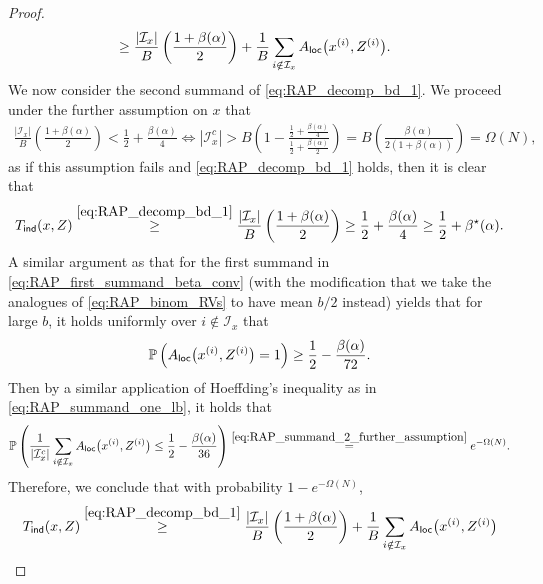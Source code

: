 \documentclass[11pt]{amsart}
\numberwithin{equation}{section}
\numberwithin{equation}{section}
\newcommand{\1}{\mathbbm{1}}
\newcommand{\Prob}{\mathbb{P}}
\newcommand{\ind}{\textup{\textsf{ind}}}
\newcommand{\loc}{\textup{\textsf{loc}}}
\theoremstyle{definition}
\begin{document}
\begin{appendices}
\begin{proof}
\begin{align}
        & \geq \frac{|\mathcal I_x|}{B}\left( \frac{1+\beta(\alpha)}{2} \right) + \frac{1}{B} \sum_{i \notin \mathcal I_x} A_\loc\big(x^{(i)}, Z^{(i)}\big). \label{eq:RAP_decomp_bd_1}
    \end{align}
    We now consider the second summand of \eqref{eq:RAP_decomp_bd_1}. We proceed under the further assumption on $x$ that
    \begin{align} \label{eq:RAP_summand_2_further_assumption}
        \frac{|\mathcal I_x|}{B}\left( \frac{1+\beta(\alpha)}{2} \right) < \frac{1}{2} + \frac{\beta(\alpha)}{4} \iff |\mathcal I_x^c| > B\left( 1 - \frac{\frac{1}{2} + \frac{\beta(\alpha)}{4}}{\frac{1}{2} + \frac{\beta(\alpha)}{2}} \right) = B\left( \frac{\beta(\alpha)}{2\left(1+\beta(\alpha)\right)} \right) = \Omega(N),
    \end{align}
    as if this assumption fails and \eqref{eq:RAP_decomp_bd_1} holds, then it is clear that
    \begin{align*}
        T_\ind(x, Z) \stackrel{\eqref{eq:RAP_decomp_bd_1}}{\geq} \frac{|\mathcal I_x|}{B}\left( \frac{1+\beta(\alpha)}{2} \right) \geq  \frac{1}{2} + \frac{\beta(\alpha)}{4} \geq \frac{1}{2} + \beta^\star(\alpha).
    \end{align*}
    A similar argument as that for the first summand in \eqref{eq:RAP_first_summand_beta_conv} (with the modification that we take the analogues of \eqref{eq:RAP_binom_RVs} to have mean $b/2$ instead) yields that for large $b$, it holds uniformly over $i \notin \mathcal I_x$ that
    \begin{align*}
        \Prob\left( A_\loc\big(x^{(i)}, Z^{(i)}\big) = 1 \right) \geq \frac{1}{2} - \frac{\beta(\alpha)}{72}.
    \end{align*}
    Then by a similar application of Hoeffding's inequality as in \eqref{eq:RAP_summand_one_lb}, it holds that
    \begin{align} \label{eq:RAP_summand_two_lb}
        \Prob\left( \frac{1}{|\mathcal I_x^c|} \sum_{i \notin \mathcal I_x} A_\loc\big(x^{(i)}, Z^{(i)}\big) \leq \frac{1}{2} - \frac{\beta(\alpha)}{36} \right) \stackrel{\eqref{eq:RAP_summand_2_further_assumption}}{=} e^{-\Omega(N)}.
    \end{align}
    Therefore, we conclude that with probability $1 - e^{-\Omega(N)}$,
    \begin{align*}
        T_\ind(x, Z) & \stackrel{\eqref{eq:RAP_decomp_bd_1}}{\geq} \frac{|\mathcal I_x|}{B}\left( \frac{1+\beta(\alpha)}{2} \right) + \frac{1}{B}\sum_{i \notin \mathcal I_x} A_\loc\big(x^{(i)}, Z^{(i)}\big) \\

\end{align*}
\end{proof}
\end{appendices}
\end{document}
